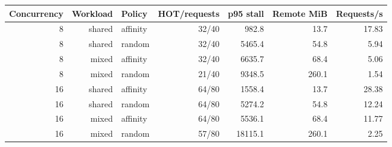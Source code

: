 \begin{tabular}{rrlrrrr}
\toprule
Concurrency & Workload & Policy & HOT/requests & p95 stall & Remote MiB & Requests/s \\
\midrule
8 & shared & affinity & 32/40 & 982.8 & 13.7 & 17.83 \\
8 & shared & random & 32/40 & 5465.4 & 54.8 & 5.94 \\
8 & mixed & affinity & 32/40 & 6635.7 & 68.4 & 5.06 \\
8 & mixed & random & 21/40 & 9348.5 & 260.1 & 1.54 \\
16 & shared & affinity & 64/80 & 1558.4 & 13.7 & 28.38 \\
16 & shared & random & 64/80 & 5274.2 & 54.8 & 12.24 \\
16 & mixed & affinity & 64/80 & 5536.1 & 68.4 & 11.77 \\
16 & mixed & random & 57/80 & 18115.1 & 260.1 & 2.25 \\
\bottomrule
\end{tabular}

